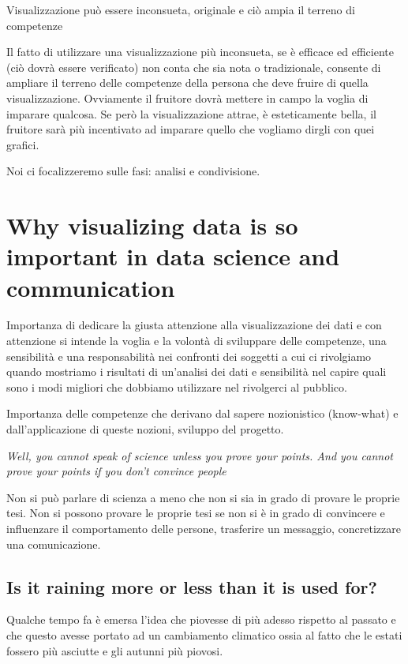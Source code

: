 \documentclass[12pt,a4paper]{report}
\begin{document}
Visualizzazione può essere inconsueta, originale e ciò ampia il terreno di competenze 

Il fatto di utilizzare una visualizzazione più inconsueta, se è efficace ed efficiente (ciò dovrà essere verificato) non conta che sia nota o tradizionale, consente di ampliare il terreno delle competenze della persona che deve fruire di quella visualizzazione. Ovviamente il fruitore dovrà mettere in campo la voglia di imparare qualcosa. Se però la visualizzazione attrae, è esteticamente bella, il fruitore sarà più incentivato ad imparare quello che vogliamo dirgli con quei grafici. 

Noi ci focalizzeremo sulle fasi: analisi e condivisione. 

\section{Why visualizing data is so important in data science and communication}

Importanza di dedicare la giusta attenzione alla visualizzazione dei dati e con attenzione si intende la voglia e la volontà di sviluppare delle competenze, una sensibilità e una responsabilità nei confronti dei soggetti a cui ci rivolgiamo quando mostriamo i risultati di un'analisi dei dati e sensibilità nel capire quali sono i modi migliori che dobbiamo utilizzare nel rivolgerci al pubblico. 

Importanza delle competenze che derivano dal sapere nozionistico (know-what) e dall'applicazione di queste nozioni, sviluppo del progetto.

\begin{center}
	\textsl{Well, you cannot speak of science unless you prove your points. And you cannot prove your points if you don't convince people}
\end{center}

Non si può parlare di scienza a meno che non si sia in grado di provare le proprie tesi. Non si possono provare le proprie tesi se non si è in grado di convincere e influenzare il comportamento delle persone, trasferire un messaggio, concretizzare una comunicazione. 


\subsection{Is it raining more or less than it is used for?}

Qualche tempo fa è emersa l'idea che piovesse di più adesso rispetto al passato e che questo avesse portato ad un cambiamento climatico ossia al fatto che le estati fossero più asciutte e gli autunni più piovosi. 
\end{document}
